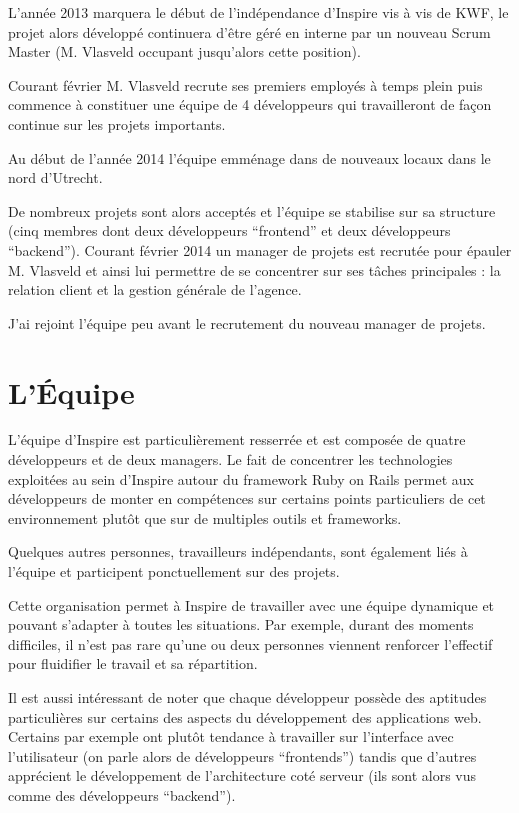 \documentclass[12pt,a4paper]{book}
\begin{document}
L'année 2013 marquera le début de l'indépendance d'Inspire vis à vis de KWF, le projet alors développé continuera d'être géré en interne par un nouveau Scrum Master (M. Vlasveld occupant jusqu'alors cette position).

Courant février M. Vlasveld recrute ses premiers employés à temps plein puis commence à constituer une équipe de 4 développeurs qui travailleront de façon continue sur les projets importants.

Au début de l'année 2014 l'équipe emménage dans de nouveaux locaux dans le nord d'Utrecht.

De nombreux projets sont alors acceptés et l'équipe se stabilise sur sa structure (cinq membres dont deux développeurs ``frontend'' et deux développeurs ``backend''). Courant février 2014 un manager de projets est recrutée pour épauler M. Vlasveld et ainsi lui permettre de se concentrer sur ses tâches principales : la relation client et la gestion générale de l'agence.

J'ai rejoint l'équipe peu avant le recrutement du nouveau manager de projets.

\section{L'Équipe}

L'équipe d'Inspire est particulièrement resserrée et est composée de quatre développeurs et de deux managers. Le fait de concentrer les technologies exploitées au sein d'Inspire autour du framework Ruby on Rails permet aux développeurs de monter en compétences sur certains points particuliers de cet environnement plutôt que sur de multiples outils et frameworks.

Quelques autres personnes, travailleurs indépendants, sont également liés à l'équipe et participent ponctuellement sur des projets.

Cette organisation permet à Inspire de travailler avec une équipe dynamique et pouvant s'adapter à toutes les situations. Par exemple, durant des moments difficiles, il n'est pas rare qu'une ou deux personnes viennent renforcer l'effectif pour fluidifier le travail et sa répartition. 

Il est aussi intéressant de noter que chaque développeur possède des aptitudes particulières sur certains des aspects du développement des applications web. Certains par exemple ont plutôt tendance à travailler sur l'interface avec l'utilisateur (on parle alors de développeurs ``frontends'') tandis que d'autres apprécient le développement de l'architecture coté serveur (ils sont alors vus comme des développeurs ``backend'').
\end{document}
